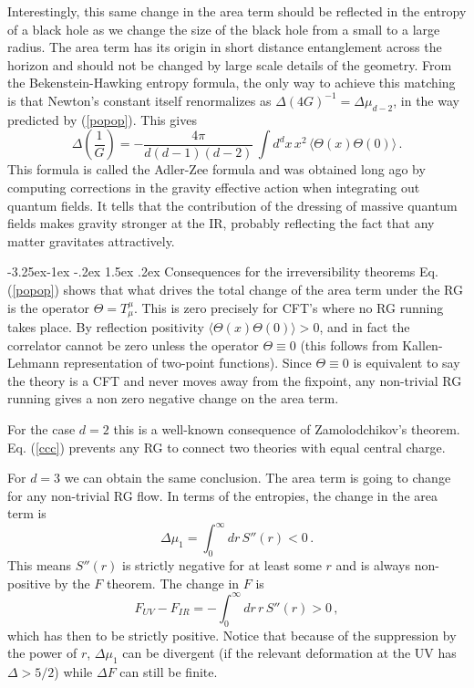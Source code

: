 \documentclass[11pt,a4paper]{article}
\makeatletter
\renewcommand\subsection{\@startsection{subsection}{2}{\z@}%
                                   {-3.25ex\@plus -1ex \@minus -.2ex}%
                                     {1.5ex \@plus .2ex}%
                                     {\normalfont\bfseries}}
\numberwithin{equation}{section}
\newcommand{\be}{\begin{equation}}
\newcommand{\ee}{\end{equation}}
\makeatother
\begin{document}
\bigskip

Interestingly, this same change in the area term should be reflected in the entropy of a black hole as we change the size of the black hole from a small to a large radius. The area term has its origin in short distance entanglement across the horizon and should not be changed by large scale details of the geometry. From the Bekenstein-Hawking entropy formula, the only way to achieve this matching is that Newton's constant itself renormalizes as $\Delta (4G)^{-1}=\Delta \mu_{d-2}$, in the way predicted by (\ref{popop}). This gives
\be
\Delta \left(\frac{1}{G}\right)= -\frac{4\pi}{d (d-1)(d-2)}\,\int d^{d}x\,x^2\,\langle \Theta(x) \Theta(0)\rangle\,.
\ee
This formula is called the Adler-Zee formula and was obtained long ago by computing corrections in the gravity effective action when integrating out quantum fields. It tells that the contribution of the dressing of massive quantum fields makes gravity stronger at the IR, probably reflecting the fact that any matter gravitates attractively.     

\subsection{Consequences for the irreversibility theorems}
Eq. (\ref{popop}) shows that what drives the total change of the area term under the RG is the operator $\Theta=T_\mu^\mu$. This is zero precisely for CFT's where no RG running takes place. By reflection positivity $\langle \Theta(x) \Theta(0)\rangle>0$, and in fact the correlator cannot be zero unless the operator $\Theta\equiv 0$ (this follows from Kallen-Lehmann representation of two-point functions). Since $\Theta\equiv 0$ is equivalent to say the theory is a CFT and never moves away from the fixpoint, any non-trivial RG running gives a non zero negative change on the area term. 

For the case $d=2$ this is a well-known consequence of Zamolodchikov's theorem. Eq. (\ref{ccc}) prevents any RG to connect two theories with equal central charge.     

For $d=3$ we can obtain the same conclusion. The area term is going to change for any non-trivial RG flow. In terms of the entropies, the change in the area term is
\be
\Delta \mu_{1}= \int_0^\infty dr\, S''(r)<0\,.
\ee
This means $S''(r)$ is strictly negative for at least some $r$ and is always non-positive by the $F$ theorem. The change in $F$ is
\be
 F_{UV}-F_{IR}= -\int_0^\infty dr\, r\, S''(r)>0\,,
\ee
which has then to be strictly positive. Notice that because of the suppression by the power of $r$, $\Delta \mu_1$ can be divergent (if the relevant deformation at the UV has $\Delta> 5/2$) while $\Delta F$ can still be finite. 
\end{document}
